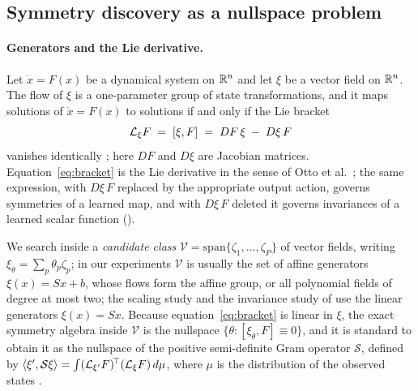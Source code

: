 \subsection{Symmetry discovery as a nullspace problem}
\label{sec:setup}

\paragraph{Generators and the Lie derivative.} Let $\dot x = F(x)$ be a
dynamical system on $\mathbb{R}^n$ and let $\xi$ be a vector field on $\mathbb{R}^n$. The flow
of $\xi$ is a one-parameter group of state transformations, and it maps
solutions of $\dot x = F(x)$ to solutions if and only if the Lie bracket
\begin{equation}
  \mathcal{L}_\xi F \;=\; [\xi, F] \;=\; DF\,\xi \;-\; D\xi\, F
  \label{eq:bracket}
\end{equation}
vanishes identically \citep[Ch.~2]{olver1993applications}; here $DF$ and
$D\xi$ are Jacobian matrices. Equation~\eqref{eq:bracket} is the Lie derivative
in the sense of Otto et al.~\citep[Eq.~16]{otto2025unified}; the same expression, with
$D\xi\,F$ replaced by the appropriate output action, governs symmetries of a
learned map, and with $D\xi\,F$ deleted it governs invariances of a learned
scalar function (\SNinvariance).

We search inside a \emph{candidate class} $\mathcal V =
\mathrm{span}\{\zeta_1, \dots,\zeta_P\}$ of vector fields, writing $\xi_\theta
= \sum_p \theta_p \zeta_p$; in our experiments $\mathcal V$ is usually the set
of affine generators $\xi(x) = Sx + b$, whose flows form the affine group, or
all polynomial fields of degree at most two; the scaling study and the
invariance study of \SNinvariance{} use the linear generators $\xi(x) = Sx$. Because equation~\eqref{eq:bracket} is
linear in $\xi$, the exact symmetry algebra inside $\mathcal V$ is the nullspace
$\{\theta : [\xi_\theta,F] \equiv 0\}$, and it is standard to obtain it as the
nullspace of the positive semi-definite Gram operator $\mathcal S$, defined by
$\langle \xi', \mathcal S\xi\rangle = \int (\mathcal{L}_{\xi'} F)^{\!\top} (\mathcal{L}_\xi F)\,
d\mu$, where $\mu$ is the distribution of the observed states
\citep[\S7]{otto2025unified}.


